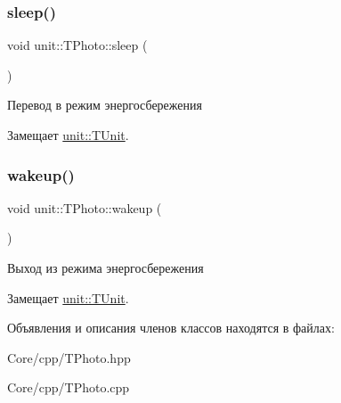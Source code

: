 \subsubsection{\texorpdfstring{sleep()}{sleep()}}
{\footnotesize\ttfamily void unit\+::\+T\+Photo\+::sleep (\begin{DoxyParamCaption}{ }\end{DoxyParamCaption})\hspace{0.3cm}{\ttfamily [virtual]}}



Перевод в режим энергосбережения 



 

Замещает \hyperlink{classunit_1_1_t_unit_afa851323a357e4287ca230d2bce8977b}{unit\+::\+T\+Unit}.

\mbox{\label{classunit_1_1_t_photo_a2d8ecace1e51abed1a68731b486680f6}} 
\subsubsection{\texorpdfstring{wakeup()}{wakeup()}}
{\footnotesize\ttfamily void unit\+::\+T\+Photo\+::wakeup (\begin{DoxyParamCaption}{ }\end{DoxyParamCaption})\hspace{0.3cm}{\ttfamily [virtual]}}



Выход из режима энергосбережения 



 

Замещает \hyperlink{classunit_1_1_t_unit_a11fd67d0186e8e60ef517d6a44db225f}{unit\+::\+T\+Unit}.



Объявления и описания членов классов находятся в файлах\+:\begin{DoxyCompactItemize}
\item 
Core/cpp/T\+Photo.\+hpp\item 
Core/cpp/T\+Photo.\+cpp\end{DoxyCompactItemize}
